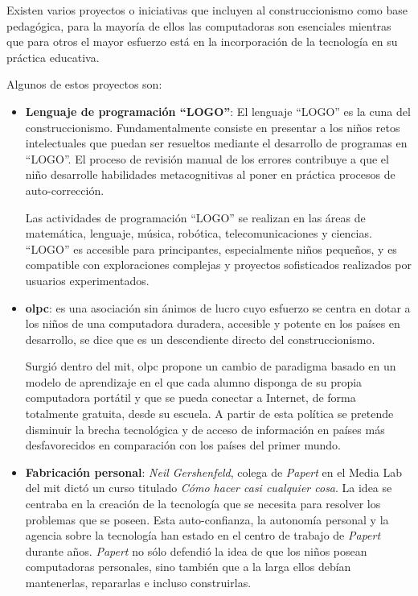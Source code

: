 Existen varios proyectos o iniciativas que incluyen al construccionismo como
base pedagógica, para la mayoría de ellos las computadoras son esenciales
mientras que para otros el mayor esfuerzo está en la incorporación de la
tecnología en su práctica educativa\cite{papertian:const}.

Algunos de estos proyectos son:

\begin{itemize}

\item \textbf{Lenguaje de programación \enquote{LOGO}}: El lenguaje
    \enquote{LOGO} es la cuna del construccionismo. Fundamentalmente consiste en
    presentar a los niños retos intelectuales que puedan ser resueltos mediante
    el desarrollo de programas en \enquote{LOGO}. El proceso de revisión manual
    de los errores contribuye a que el niño desarrolle habilidades
    metacognitivas al poner en práctica procesos de
    auto-corrección\cite{logo:sg}.

    Las actividades de programación \enquote{LOGO} se realizan en las áreas de
    matemática, lenguaje, música, robótica, telecomunicaciones y ciencias.
    \enquote{LOGO} es accesible para principantes, especialmente niños pequeños,
    y es compatible con exploraciones complejas y proyectos sofisticados
    realizados por usuarios experimentados\cite{logo:sg}.
    
\item \textbf{\Gls{olpc}}: es una asociación sin ánimos de lucro cuyo esfuerzo
    se centra en dotar a los niños de una computadora duradera, accesible y
    potente en los países en desarrollo, se dice que es un descendiente directo
    del construccionismo\cite{papertian:const}.
	
    Surgió dentro del \gls{mit}, \Gls{olpc} propone un cambio de paradigma
    basado en un modelo de aprendizaje en el que cada alumno disponga de su
    propia computadora portátil y que se pueda conectar a Internet, de forma
    totalmente gratuita, desde su escuela. A partir de esta política se pretende
    disminuir la brecha tecnológica y de acceso de información en países más
    desfavorecidos en comparación con los países del primer
    mundo\cite{videojuegos:gonzaleztardon}.
	
\item \textbf{Fabricación personal}: \textit{Neil Gershenfeld}, colega de
    \textit{Papert} en el Media Lab del \Gls{mit} dictó un curso titulado
    \emph{Cómo hacer casi cualquier cosa}. La idea se centraba en la creación de
    la tecnología que se necesita para resolver los problemas que se poseen.
    Esta auto-confianza, la autonomía personal y la agencia sobre la tecnología
    han estado en el centro de trabajo de \textit{Papert} durante años.
    \textit{Papert} no sólo defendió la idea de que los niños posean
    computadoras personales, sino también que a la larga ellos debían
    mantenerlas, repararlas e incluso construirlas.


\end{itemize}
